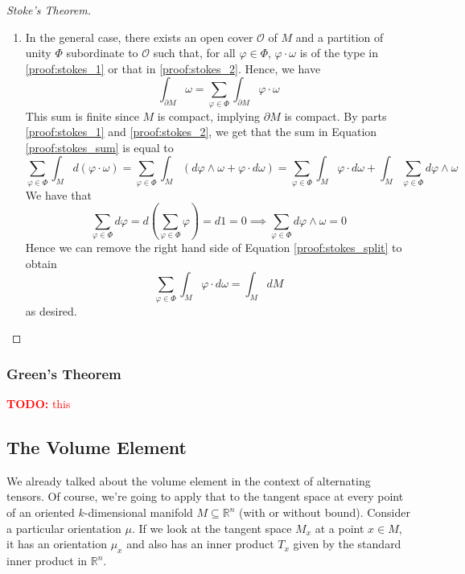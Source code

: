 \documentclass{article}
\newcommand{\reals}[0]{\mathbb{R}}
\newcommand{\mc}[1]{\mathcal{#1}}
\newcommand{\TODO}[1]{\textcolor{red}{\textbf{TODO:} #1}}
\begin{document}
\begin{proof}[Stoke's Theorem]
\begin{enumerate}
  \item In the general case, there exists an open cover \(\mc{O}\) of \(M\) and a partition of unity \(\Phi\) subordinate to \(\mc{O}\) such that, for all \(\varphi \in \Phi\), \(\varphi\cdot\omega\) is of the type in \ref{proof:stokes_1} or that in \ref{proof:stokes_2}.
  Hence, we have
  \begin{equation}
    \int_{\partial M}\omega = \sum_{\varphi \in \Phi}\int_{\partial M}\varphi \cdot \omega
    \label{proof:stokes_sum}
  \end{equation}
  This sum is finite since \(M\) is compact, implying \(\partial M\) is compact. By parts \ref{proof:stokes_1} and \ref{proof:stokes_2}, we get that the sum in Equation \ref{proof:stokes_sum} is equal to
  \begin{equation}
    \sum_{\varphi \in \Phi}\int_Md(\varphi \cdot \omega)
    = \sum_{\varphi \in \Phi}\int_M(d\varphi \wedge \omega + \varphi \cdot d\omega)
    = \sum_{\varphi \in \Phi}\int_M\varphi \cdot d\omega + \int_M \sum_{\varphi \in \Phi}d\varphi \wedge \omega
    \label{proof:stokes_split}
  \end{equation}
  We have that
  \begin{equation}
    \sum_{\varphi \in \Phi}d\varphi = d\left(\sum_{\varphi \in \Phi}\varphi\right)
    = d1 = 0 \implies \sum_{\varphi \in \Phi}d\varphi \wedge \omega = 0
  \end{equation}
  Hence we can remove the right hand side of Equation \ref{proof:stokes_split} to obtain
  \begin{equation}
    \sum_{\varphi \in \Phi}\int_M\varphi \cdot d\omega = \int_MdM
  \end{equation}
  as desired.

\end{enumerate}

\end{proof}

\subsubsection{Green's Theorem}

\TODO{this}

\subsection{The Volume Element}

We already talked about the volume element in the context of alternating tensors. Of course, we're going to apply that to the tangent space at every point of an oriented \(k\)-dimensional manifold \(M \subseteq \reals^n\) (with or without bound). Consider a particular orientation \(\mu\). If we look at the tangent space \(M_x\) at a point \(x \in M\), it has an orientation \(\mu_x\) and also has an inner product \(T_x\) given by the standard inner product in \(\reals^n\).
\end{document}
